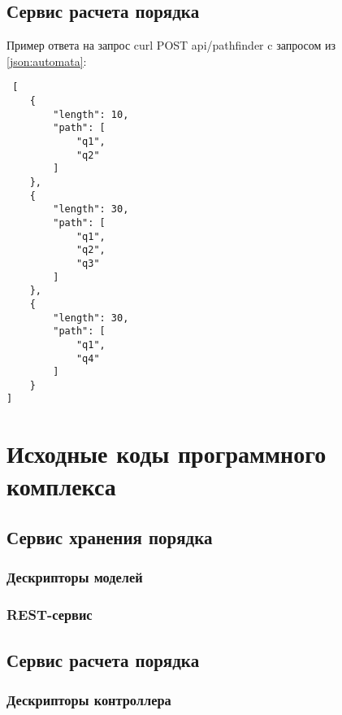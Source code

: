 \section{Сервис расчета порядка}\label{json:pathfinder}

Пример ответа на запрос curl POST api/pathfinder c запросом из \ref{json:automata}:
\begin{lstlisting}
 [
    {
        "length": 10, 
        "path": [
            "q1", 
            "q2"
        ]
    }, 
    {
        "length": 30, 
        "path": [
            "q1", 
            "q2", 
            "q3"
        ]
    }, 
    {
        "length": 30, 
        "path": [
            "q1", 
            "q4"
        ]
    }
]

\end{lstlisting}


\chapter{Исходные коды программного комплекса} \label{sources}

\section{Сервис хранения порядка}

\subsection{Дескрипторы моделей}

% 

\subsection{REST-сервис}

% 

\section{Сервис расчета порядка}

\subsection{Дескрипторы контроллера}

% 

